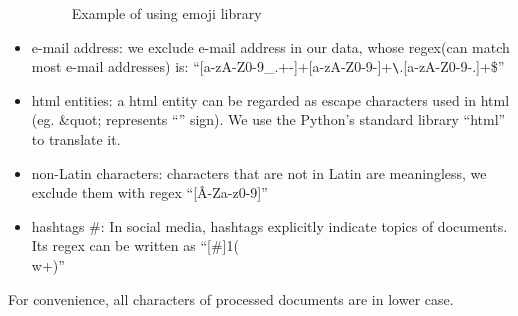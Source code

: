 \begin{itemize}
\begin{figure}[!htbp]
            \caption{Example of using emoji library}
            \label{fig:emo_lib}
        \end{figure}
        \item e-mail address: we exclude e-mail address in our data, whose regex(can match most e-mail addresses) is:
        ``[a-zA-Z0-9\_.+-]+\@[a-zA-Z0-9-]+\verb|\|.[a-zA-Z0-9-.]+\$''
        \item html entities: a html entity can be regarded as escape characters used in html (eg. \&quot; represents ``'' sign). We use the Python's standard library ``html'' to translate it.
        \item non-Latin characters: characters that are not in Latin are meaningless, we exclude them with regex ``[\^A-Za-z0-9]'' 
        \item hashtags \#: In social media, hashtags explicitly indicate topics of documents. Its regex can be written as ``[\#]{1}(\\w+)''
    \end{itemize}
For convenience, all characters of processed documents are in lower case. 

